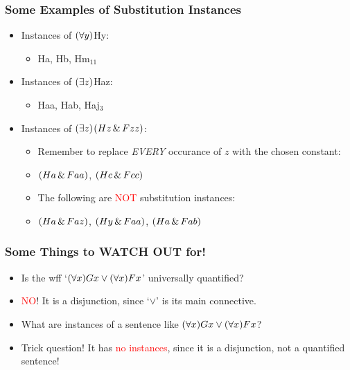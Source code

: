 \begin{frame}
\frametitle{Some Examples of Substitution Instances}

\begin{itemize}[<+->]

\item Instances of $(\forall y)$Hy: 

\begin{itemize}

\item Ha, Hb, Hm$_{11}$  

\end{itemize}

\item Instances of $(\exists z)$Haz: 

\begin{itemize}

\item Haa, Hab, Haj$_3$  

\end{itemize}

\item Instances of $(\exists z)$$(Hz \,\&\, Fzz)$:

\begin{itemize}

\item Remember to replace \emph{EVERY} occurance of $z$ with the chosen constant:

\item $(Ha \,\&\, Faa)$, $(Hc \,\&\, Fcc)$

\item The following are \textcolor{red}{NOT} substitution instances:

\item $(Ha \,\&\, Faz)$, $(Hy \,\&\, Faa)$, $(Ha \,\&\, Fab)$

\end{itemize}

\end{itemize}
\end{frame}

\begin{frame}
\frametitle{Some Things to WATCH OUT for!}

\begin{itemize}[<+->]

\item Is the wff `$(\forall x) Gx \vee (\forall x) Fx$' universally quantified?

\item \textcolor{red}{NO}! It is a disjunction, since `$\lor$' is its main connective. 

\item What are instances of a sentence like $(\forall x) Gx \vee (\forall x) Fx$?

\item Trick question! It has \textcolor{red}{no instances}, since it is a disjunction, not a quantified sentence!

\end{itemize}
\end{frame}

